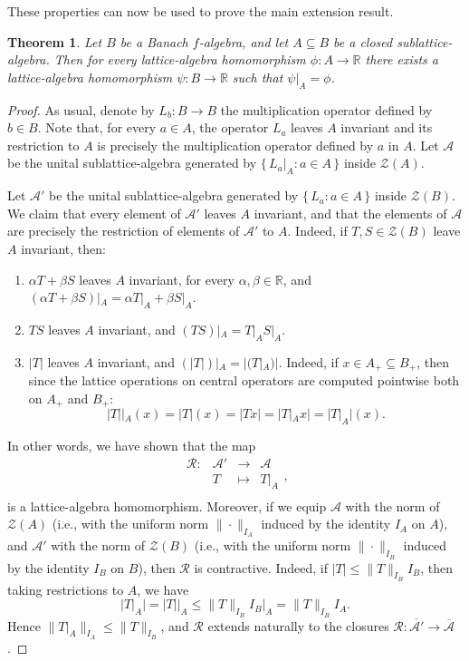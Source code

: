 \documentclass{memo-l}
\newtheorem{thm}[theorem]{Theorem}
\theoremstyle{definition}
\theoremstyle{remark}
\numberwithin{section}{chapter}
\numberwithin{equation}{chapter}
\newcommand\R{\ensuremath{\mathbb{R}}}
\newcommand{\falg}{$f\!$-algebra}
\begin{document}
These properties can now be used to prove the main extension result.

\begin{thm}\label{thm:extension}
    Let $B$ be a Banach \falg, and let $A\subseteq B$ be a closed
    sublattice-algebra. Then
    for every lattice-algebra homomorphism $\phi \colon A\to \R$ there
    exists a lattice-algebra homomorphism $\psi \colon B\to \R$ such that
    $\psi |_A=\phi $.
\end{thm}
\begin{proof}
    As usual, denote by $L_b\colon B\to B$ the multiplication operator
    defined by $b
    \in B$. Note that, for every $a \in A$, the operator $L_a$ leaves
    $A$ invariant and its restriction to $A$ is precisely the
    multiplication operator defined by $a$ in $A$. Let $\mathcal{A}$
    be the unital sublattice-algebra generated by $\{\,
    L_a|_A : a \in A \, \}$ inside $\mathcal{Z}(A)$.

    Let $\mathcal{A}'$ be the unital sublattice-algebra generated by
    $\{\, L_a : a \in A \, \} $ inside $\mathcal{Z}(B)$. We claim that
    every element of $\mathcal{A}'$ leaves $A$ invariant, and that the
    elements of $\mathcal{A}$ are precisely the restriction of
    elements of $\mathcal{A}'$ to $A$. Indeed, if $T,S \in
    \mathcal{Z}(B)$ leave $A$ invariant, then:
    \begin{enumerate}
        \item $\alpha T+\beta S$ leaves $A$ invariant, for every
            $\alpha ,\beta  \in \R$, and $(\alpha T+\beta S)|_A=\alpha
            T|_A+\beta S|_A$.
        \item $TS$ leaves $A$ invariant, and $(TS)|_A=T|_AS|_A$.
        \item $|T|$ leaves $A$ invariant, and $(|T|) |_A=|(T|_A)|$.
            Indeed, if $x \in A_+\subseteq B_+$, then since the
            lattice operations on central operators are computed
            pointwise both on $A_+$ and $B_+$:
            \[
                |T| |_A(x)=|T|(x)=|Tx|=|T|_Ax|=|T|_A|(x).
            \]
    \end{enumerate}

    In other words, we have shown that the map
    \[
    \begin{array}{cccc}
    \mathcal{R}\colon& \mathcal{A}' & \longrightarrow & \mathcal{A} \\
            & T & \longmapsto & T|_A \\
    \end{array},
    \]
    is a lattice-algebra homomorphism.
    Moreover, if we equip $\mathcal{A}$ with the norm of
    $\mathcal{Z}(A)$ (i.e., with the uniform norm $\|{\cdot }\|_{I_A}$
    induced by the identity $I_A$ on $A$), and $\mathcal{A}'$ with the
    norm of $\mathcal{Z}(B)$ (i.e., with the uniform norm $\|{\cdot
    }\|_{I_B}$ induced by the identity $I_B$ on $B$), then
    $\mathcal{R}$ is contractive. Indeed, if $|T|\le \|T\|_{I_B} I_B$, then
    taking restrictions to $A$, we have 
    \[
    |T|_A|=|T| |_A\le \|T\|_{I_B} I_B|_A=\|T\|_{I_B}I_A.
    \]
    Hence $\|T|_A\|_{I_A}\le \|T\|_{I_B}$, and
    $\mathcal{R}$ extends naturally to the closures $\mathcal{R}\colon
    \overline{\mathcal{A}'}\to \overline{\mathcal{A}}$.


\end{proof}
\end{document}
